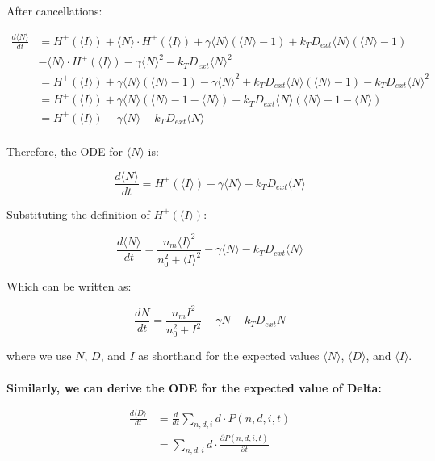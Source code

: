 \documentclass{article}
\begin{document}
\begin{flushleft}
After cancellations:

\begin{align*}
\frac{d\langle N \rangle}{dt} &= H^+(\langle I \rangle) + \langle N \rangle \cdot H^+(\langle I \rangle) + \gamma \langle N \rangle (\langle N \rangle - 1) + k_T D_{ext} \langle N \rangle (\langle N \rangle - 1) \\
&- \langle N \rangle \cdot H^+(\langle I \rangle) - \gamma \langle N \rangle^2 - k_T D_{ext} \langle N \rangle^2 \\
&= H^+(\langle I \rangle) + \gamma \langle N \rangle (\langle N \rangle - 1) - \gamma \langle N \rangle^2 + k_T D_{ext} \langle N \rangle (\langle N \rangle - 1) - k_T D_{ext} \langle N \rangle^2 \\
&= H^+(\langle I \rangle) + \gamma \langle N \rangle (\langle N \rangle - 1 - \langle N \rangle) + k_T D_{ext} \langle N \rangle (\langle N \rangle - 1 - \langle N \rangle) \\
&= H^+(\langle I \rangle) - \gamma \langle N \rangle - k_T D_{ext} \langle N \rangle \\
\end{align*}

Therefore, the ODE for $\langle N \rangle$ is:

\[
\frac{d\langle N \rangle}{dt} = H^+(\langle I \rangle) - \gamma \langle N \rangle - k_T D_{ext} \langle N \rangle
\]

Substituting the definition of $H^+(\langle I \rangle)$:

\[
\frac{d\langle N \rangle}{dt} = \frac{n_m \langle I \rangle^2}{n_0^2 + \langle I \rangle^2} - \gamma \langle N \rangle - k_T D_{ext} \langle N \rangle
\]

Which can be written as:

\[
\frac{dN}{dt} = \frac{n_m I^2}{n_0^2 + I^2} - \gamma N - k_T D_{ext} N
\]

where we use $N$, $D$, and $I$ as shorthand for the expected values $\langle N \rangle$, $\langle D \rangle$, and $\langle I \rangle$.\\~\\

\textbf{Similarly, we can derive the ODE for the expected value of Delta:}

\begin{align*}
\frac{d\langle D \rangle}{dt} &= \frac{d}{dt}\sum_{n,d,i} d \cdot P(n,d,i,t) \\
&= \sum_{n,d,i} d \cdot \frac{\partial P(n,d,i,t)}{\partial t}
\end{align*}


\end{flushleft}
\end{document}
